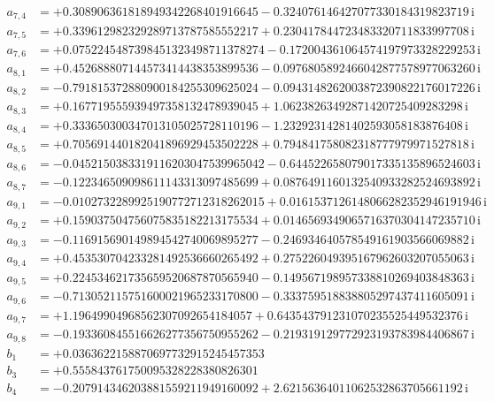 {\begin{align*}
a_{7,4} &= +0.308906361818949342268401916645 - 0.324076146427077330184319823719\,\mathrm{i}\\
a_{7,5} &= +0.339612982329289713787585552217 + 0.230417844723483320711833997708\,\mathrm{i}\\
a_{7,6} &= +0.0752245487398451323498711378274 - 0.172004361064574197973328229253\,\mathrm{i}\\
a_{8,1} &= +0.452688807144573414438353899536 - 0.0976805892466042877578977063260\,\mathrm{i}\\
a_{8,2} &= -0.791815372880900184255309625024 - 0.0943148262003872390822176017226\,\mathrm{i}\\
a_{8,3} &= +0.167719555939497358132478939045 + 1.06238263492871420725409283298\,\mathrm{i}\\
a_{8,4} &= +0.333650300347013105025728110196 - 1.23292314281402593058183876408\,\mathrm{i}\\
a_{8,5} &= +0.705691440182041896929453502228 + 0.794841758082318777979971527818\,\mathrm{i}\\
a_{8,6} &= -0.0452150383319116203047539965042 - 0.644522658079017335135896524603\,\mathrm{i}\\
a_{8,7} &= -0.122346509098611143313097485699 + 0.0876491160132540933282524693892\,\mathrm{i}\\
a_{9,1} &= -0.0102732289925190772712318262015 + 0.0161537126148066282352946191946\,\mathrm{i}\\
a_{9,2} &= +0.159037504756075835182213175534 + 0.0146569349065716370304147235710\,\mathrm{i}\\
a_{9,3} &= -0.116915690149894542740069895277 - 0.246934640578549161903566069882\,\mathrm{i}\\
a_{9,4} &= +0.453530704233281492536660265492 + 0.275226049395167962603207055063\,\mathrm{i}\\
a_{9,5} &= +0.224534621735659520687870565940 - 0.149567198957338810269403848363\,\mathrm{i}\\
a_{9,6} &= -0.713052115751600021965233170800 - 0.333759518838805297437411605091\,\mathrm{i}\\
a_{9,7} &= +1.19649904968562307092654184057 + 0.643543791231070235525449532376\,\mathrm{i}\\
a_{9,8} &= -0.193360845516626277356750955262 - 0.219319129772923193783984406867\,\mathrm{i}\\[1mm]
b_{1} &= +0.0363622158870697732915245457353\\
b_{3} &= +0.555843761750095328228380826301\\
b_{4} &= -0.207914346203881559211949160092 + 2.62156364011062532863705661192\,\mathrm{i}\\

\end{align*}}
